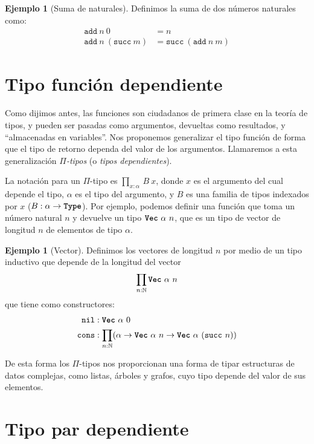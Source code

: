 \documentclass[
  a4paper, 
  10pt, 
  parskip=half, 
  toc=bibliography,
]{scrbook}
\theoremstyle{definition}
\theoremstyle{bolddef}
\newtheorem{example}[theorem]{Ejemplo}
\newcommand{\funfont}[1]{\texttt{#1}}
\newcommand{\tyfont}[1]{\texttt{\textbf{#1}}}
\begin{document}
\begin{example}[Suma de naturales]
  Definimos la suma de dos números naturales como:
  \begin{align*}
    \funfont{add} \ n \ 0 &= n \\
    \funfont{add} \ n \ (\funfont{succ} \ m) &= \funfont{succ} \ (\funfont{add} \ n \ m)
  \end{align*}
\end{example}

\section{Tipo función dependiente}

Como dijimos antes, las funciones son ciudadanos de primera clase en la teoría de tipos,
y pueden ser pasadas como argumentos, devueltas como resultados, y \enquote{almacenadas en
variables}. Nos proponemos generalizar el tipo función de forma que el tipo de
retorno dependa del valor de los argumentos. Llamaremos a esta generalización \emph{\(\Pi\)-tipos}
(o \emph{tipos dependientes}).

La notación para un \(\Pi\)-tipo es \(\prod_{x: \alpha} \, B  \ x\), donde \(x\) es el argumento
del cual depende el tipo, \(\alpha\) es el tipo del argumento, y \(B\) es una familia
de tipos indexados por \(x\) (\(B: \alpha \to \tyfont{Type}\)). Por ejemplo, podemos
definir una función que toma un número natural \(n\) y devuelve un tipo
\(\tyfont{Vec} \ \alpha \ n\), que es un tipo de vector de longitud \(n\) de
elementos de tipo \(\alpha\).
\begin{example}[Vector]
  Definimos los vectores de longitud \(n\) por medio de un tipo inductivo que depende de la
  longitud del vector
  \[
  \prod_{n: \mathbb{N}} \tyfont{Vec} \ \alpha \ n
  \]
  que tiene como constructores:
  \begin{align*}
    \funfont{nil} & : \tyfont{Vec} \ \alpha \ 0 \\
    \funfont{cons} & : \prod_{n: \mathbb{N}}
    (\alpha \to \tyfont{Vec} \ \alpha \ n
      \to \tyfont{Vec} \ \alpha \ (\funfont{succ} \ n)) 
  \end{align*}
\end{example}

De esta forma los \(\Pi\)-tipos nos proporcionan una forma de tipar estructuras de
datos complejas, como listas, árboles y grafos, cuyo tipo depende del valor
de sus elementos. 

\section{Tipo par dependiente}
\end{document}

